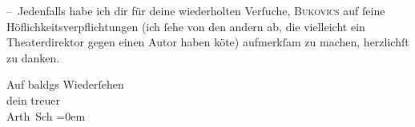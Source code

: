 \pstart
           – Jedenfalls habe ich dir für deine wiederholten Verſuche, \textsc{Bukovics} auf{ }ſeine Höflichkeitsverpflichtungen (ich{ }ſehe von den andern ab, die
               vielleicht ein Theaterdirektor gegen einen Autor haben kö{\geminationn}te) aufmerkſam zu machen, herzlichſt zu danken.\pend
           
\pstart
           {\pb}Auf baldgs
               Wiederſehen{\\[\baselineskip]}dein treuer{\\[\baselineskip]}\spacefill\mbox{Arth Sch}\pend
           \leftskip=0em{}\endnumbering{}  \newcommand{\dateiname}{L01189}\newcommand{\titel}{Arthur Schnitzler an Hermann Bahr, 11. 12. 1901}\newcommand{\editorInnen}{Herausgegeben von Martin Anton Müller}
